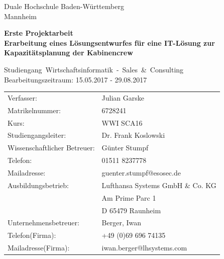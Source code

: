 \documentclass [12pt, a4paper, oneside, titlepage, ngerman]{article}
\begin{document}
\begin{titlepage}
\Large
\begin{minipage}{\textwidth} \centering \Large
     Duale Hochschule Baden-Württemberg \\  
     Mannheim 
\end{minipage} \vspace{1cm}

\begin{minipage}{\textwidth} \centering \Large
     \textbf{Erste Projektarbeit \\ Erarbeitung eines Lösungsentwurfes für eine IT-Lösung zur Kapazitätsplanung der Kabinencrew}
\end{minipage} \vspace{1cm}

\begin{minipage}{\textwidth} \centering \Large
     \mbox{Studiengang Wirtschaftsinformatik - Sales \& Consulting}\\  \large Bearbeitungszeitraum: 15.05.2017 - 29.08.2017
\end{minipage} \vspace{1cm}


\begin{table}[h!]
\begin{tabular}{ll}
Verfasser: & Julian Garske \\
Matrikelnummer: & 6728241 \vspace{0.5cm} \\ 
Kurs: & WWI SCA16 \\
Studiengangsleiter:& Dr. Frank Koslowski \vspace{0.5cm} \\
Wissenschaftlicher Betreuer: & Günter Stumpf \\ 
Telefon:& 01511 8237778\\ 
Mailadresse:& guenter.stumpf@esosec.de \vspace{0.5cm}\\
Ausbildungsbetrieb: &Lufthansa Systems GmbH \& Co. KG \\ 
& Am Prime Parc 1 \\ 
& D 65479 Raunheim \vspace{0.5cm}\\
Unternehmensbetreuer: &Berger, Iwan \\ 
Telefon(Firma): &+49 (0)69 696 74135 \\
 Mailadresse(Firma):& iwan.berger@lhsystems.com \\
\end{tabular}
\end{table}



\end{titlepage}
\end{document}
